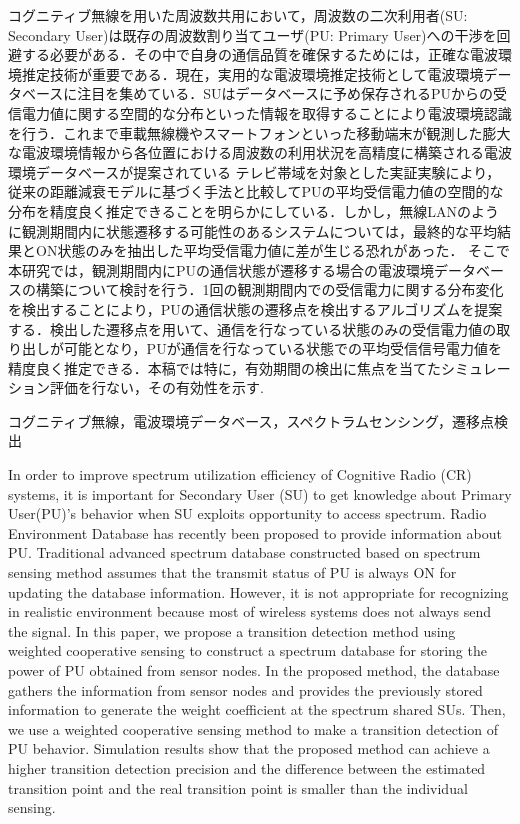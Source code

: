\documentclass[technicalreport]{ieicej}
\begin{document}
\begin{jabstract}
 コグニティブ無線を用いた周波数共用において，周波数の二次利用者(SU: Secondary User)は既存の周波数割り当てユーザ(PU: Primary User)への干渉を回避する必要がある．その中で自身の通信品質を確保するためには，正確な電波環境推定技術が重要である．現在，実用的な電波環境推定技術として電波環境データベースに注目を集めている．SUはデータベースに予め保存されるPUからの受信電力値に関する空間的な分布といった情報を取得することにより電波環境認識を行う．これまで車載無線機やスマートフォンといった移動端末が観測した膨大な電波環境情報から各位置における周波数の利用状況を高精度に構築される電波環境データベースが提案されている
テレビ帯域を対象とした実証実験により，従来の距離減衰モデルに基づく手法と比較してPUの平均受信電力値の空間的な分布を精度良く推定できることを明らかにしている．しかし，無線LANのように観測期間内に状態遷移する可能性のあるシステムについては，最終的な平均結果とON状態のみを抽出した平均受信電力値に差が生じる恐れがあった．
そこで本研究では，観測期間内にPUの通信状態が遷移する場合の電波環境データベースの構築について検討を行う．1回の観測期間内での受信電力に関する分布変化を検出することにより，PUの通信状態の遷移点を検出するアルゴリズムを提案する．検出した遷移点を用いて、通信を行なっている状態のみの受信電力値の取り出しが可能となり，PUが通信を行なっている状態での平均受信信号電力値を精度良く推定できる．本稿では特に，有効期間の検出に焦点を当てたシミュレーション評価を行ない，その有効性を示す.


\end{jabstract}
\begin{jkeyword}
コグニティブ無線，電波環境データベース，スペクトラムセンシング，遷移点検出
\end{jkeyword}
\begin{eabstract}
In order to improve spectrum utilization efficiency of Cognitive Radio (CR) systems, it is important for Secondary User (SU) to get knowledge about Primary User(PU)’s behavior when SU exploits opportunity to access spectrum. Radio Environment Database has recently been proposed to provide information about PU. Traditional advanced spectrum database constructed based on spectrum sensing method assumes that the transmit status of PU is always ON for updating the database information. However, it is not appropriate for recognizing in realistic environment because most of wireless systems does not always send the signal. In this paper, we propose a transition detection method using weighted cooperative sensing to construct a spectrum database for storing the power of PU obtained from sensor nodes. In the proposed method, the database gathers the information from sensor nodes and provides the previously stored information to generate the weight coefficient at the spectrum shared SUs. Then, we use a weighted cooperative sensing method to make a transition detection of PU behavior. Simulation results show that the proposed method can achieve a higher transition detection precision and the difference between the estimated transition point and the real transition point is smaller than the individual sensing.  
\end{eabstract}
\end{document}
